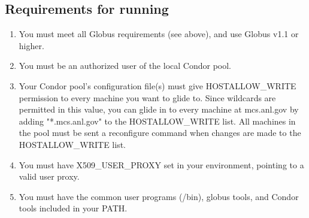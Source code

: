 \subsection{Requirements for running }
\begin{enumerate}
\item You must meet all Globus requirements (see above), and use Globus v1.1 or higher.

\item You must be an authorized user of the local Condor pool.

\item Your Condor pool's configuration file(s) must give HOSTALLOW_WRITE
  permission to every machine you want to glide to. Since wildcards
  are permitted in this value, you can glide in to every machine at
  mcs.anl.gov by adding "*.mcs.anl.gov" to the HOSTALLOW_WRITE list.
  All machines in the pool must be sent a reconfigure command when
  changes are made to the HOSTALLOW_WRITE list.

\item You must have X509_USER_PROXY set in your environment, pointing to a
  valid user proxy.

\item You must have the common user programs (/bin), globus tools, and Condor
  tools included in your PATH.
\end{enumerate}


